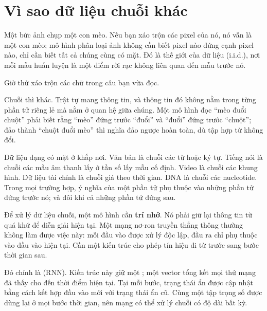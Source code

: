 %

\section{Vì sao dữ liệu chuỗi khác}
\label{sec:ch01-vi-sao-chuoi-khac}

Một bức ảnh chụp một con mèo. Nếu bạn xáo trộn các pixel của nó, nó vẫn là
một con mèo; mô hình phân loại ảnh không cần biết pixel nào đứng cạnh pixel
nào, chỉ cần biết tất cả chúng cùng có mặt. Đó là thế giới của dữ liệu
 (i.i.d.), nơi mỗi mẫu huấn luyện là một điểm rời rạc không liên
quan đến mẫu trước nó.

Giờ thử xáo trộn các chữ trong câu bạn vừa đọc.

Chuỗi thì khác. Trật tự mang thông tin, và thông tin đó không nằm trong từng
phần tử riêng lẻ mà nằm ở quan hệ giữa chúng. Một mô hình đọc ``mèo đuổi
chuột'' phải biết rằng ``mèo'' đứng trước ``đuổi'' và ``đuổi'' đứng trước
``chuột''; đảo thành ``chuột đuổi mèo'' thì nghĩa đảo ngược hoàn toàn, dù
tập hợp từ không đổi.

Dữ liệu dạng  có mặt ở khắp nơi. Văn bản là chuỗi các từ
hoặc ký tự. Tiếng nói là chuỗi các mẫu âm thanh lấy ở tần số lấy mẫu cố định.
Video là chuỗi các khung hình. Dữ liệu tài chính là chuỗi giá theo thời gian.
DNA là chuỗi các nucleotide. Trong mọi trường hợp, ý nghĩa của một phần tử
phụ thuộc vào những phần tử đứng trước nó; và đôi khi cả những phần tử đứng
sau.

Để xử lý dữ liệu chuỗi, một mô hình cần \textbf{trí nhớ}. Nó phải giữ lại
thông tin từ quá khứ để diễn giải hiện tại. Một mạng nơ-ron truyền thẳng
thông thường không làm được việc này: mỗi đầu vào được xử lý độc lập, đầu ra
chỉ phụ thuộc vào đầu vào hiện tại. Cần một kiến trúc cho phép tín hiệu đi
từ  trước sang bước thời gian sau.

Đó chính là  (RNN). Kiến trúc này
giữ một ; một vector tổng kết mọi thứ mạng
đã thấy cho đến thời điểm hiện tại. Tại mỗi bước, trạng thái ẩn được cập nhật
bằng cách kết hợp đầu vào mới với trạng thái ẩn cũ. Cùng một tập trọng số
được dùng lại ở mọi bước thời gian, nên mạng có thể xử lý chuỗi có độ dài bất
kỳ.

